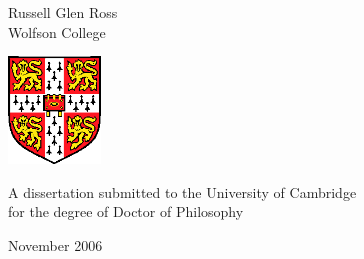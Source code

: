 
\begin{titlepage}
\begin{center}
\vspace*{\fill}

\huge
\thesistitlebig

\vfill
\vfill

\huge
Russell Glen Ross\\[6mm]
\large
Wolfson College

\vfill
\includegraphics[width=70pt]{figures/camshield}
\vfill

\large
A dissertation submitted to the University of Cambridge\\
for the degree of Doctor of Philosophy

\vfill

November 2006

\vspace*{\fill}
\end{center}
\end{titlepage}